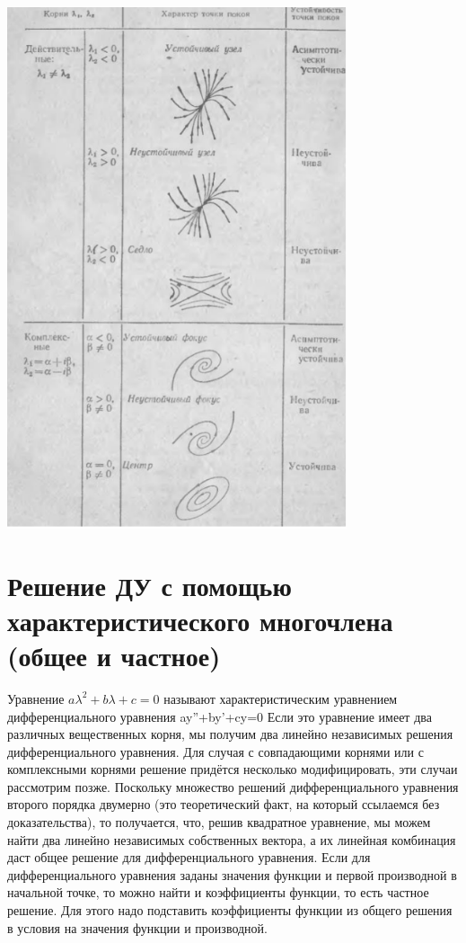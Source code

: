 \documentclass[12pt]{article}
\begin{document}
    \includegraphics[width=100mm]{graphics/31_de_2.png}

    \section{ Решение ДУ с помощью характеристического многочлена (общее и частное)}
    Уравнение $a\lambda^2+b\lambda+c=0$ называют характеристическим уравнением дифференциального уравнения ay''+by'+cy=0 Если это уравнение имеет два различных вещественных корня, мы получим
    два линейно независимых решения дифференциального уравнения. Для случая с совпадающими корнями
    или с комплексными корнями решение придётся несколько модифицировать, эти случаи рассмотрим позже.
    Поскольку множество решений дифференциального уравнения второго порядка двумерно (это
    теоретический факт, на который ссылаемся без доказательства), то получается, что, решив квадратное
    уравнение, мы можем найти два линейно независимых собственных вектора, а их линейная комбинация
    даст общее решение для дифференциального уравнения.
    Если для дифференциального уравнения заданы значения функции и первой производной в начальной
    точке, то можно найти и коэффициенты функции, то есть частное решение. Для этого надо подставить
    коэффициенты функции из общего решения в условия на значения функции и производной.
\end{document}
